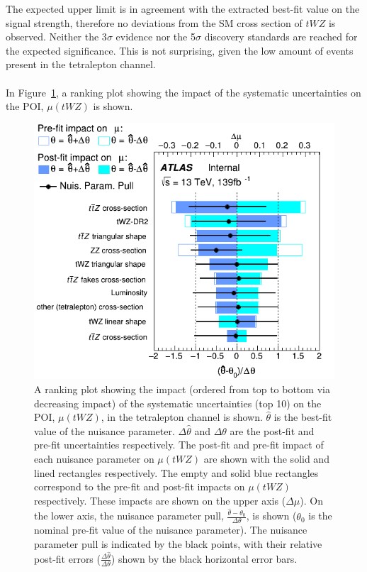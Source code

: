 The expected upper limit is in agreement with the extracted best-fit value on the signal strength, therefore no deviations from the SM cross section of $tWZ$ is observed. Neither the 3$\sigma$ evidence nor the 5$\sigma$ discovery standards are reached for the expected significance. This is not surprising, given the low amount of events present in the tetralepton channel.\\\\

In Figure~\ref{fig:4lep-PostFit-nuisance-ranking}, a ranking plot showing the impact of the systematic uncertainties on the POI, $\mu (tWZ)$ is shown.

\begin{figure}[h!]
\centering
    \includegraphics[width=.65\textwidth]{figures/PostFitPlots/RankingSysts_SigXsecOverSM_systs}
    \caption{A ranking plot showing the impact (ordered from top to bottom via decreasing impact) of the systematic uncertainties (top 10) on the POI, $\mu (tWZ)$, in the tetralepton channel is shown. $\hat{\theta}$ is the best-fit value of the nuisance parameter. $\Delta \hat{\theta}$ and $\Delta\theta$ are the post-fit and pre-fit uncertainties respectively. The post-fit and pre-fit impact of each nuisance parameter on $\mu (tWZ)$ are shown with the solid and lined rectangles respectively. The empty and solid blue rectangles correspond to the pre-fit and post-fit impacts on $\mu (tWZ)$ respectively. These impacts are shown on the upper axis ($\Delta \mu$). On the lower axis, the nuisance parameter pull, $\frac{\hat{\theta} - \theta_{0}}{\Delta{\theta}}$, is shown ($\theta_{0}$ is the nominal pre-fit value of the nuisance parameter). The nuisance parameter pull is indicated by the black points, with their relative post-fit errors ($\frac{\Delta \hat{\theta}}{\Delta \theta}$) shown by the black horizontal error bars.}
  \label{fig:4lep-PostFit-nuisance-ranking}
\end{figure}

